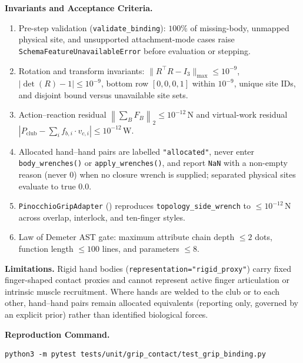 \documentclass[11pt,a4paper]{article}
\begin{document}
\textbf{Invariants and Acceptance Criteria.}
\begin{enumerate}[leftmargin=*,noitemsep]
\item Pre-step validation (\texttt{validate\_binding}): $100\%$ of missing-body, unmapped physical site, and unsupported attachment-mode
cases raise \texttt{SchemaFeatureUnavailableError} before evaluation or stepping.
\item Rotation and transform invariants: $\|R^{\top} R - I_3\|_{\max} \le 10^{-9}$, $|\det(R) - 1| \le 10^{-9}$, bottom row $[0,0,0,1]$ within $10^{-9}$,
unique site IDs, and disjoint bound versus unavailable site sets.
\item Action--reaction residual $\left\|\sum_{B} F_{B}\right\|_2 \le 10^{-12}$\,N and virtual-work residual
$|P_{\mathrm{club}} - \sum_i f_{b,i} \cdot v_{c,i}| \le 10^{-12}$\,W.
\item Allocated hand--hand pairs are labelled \texttt{"allocated"}, never enter \texttt{body\_wrenches()} or \texttt{apply\_wrenches()},
and report \texttt{NaN} with a non-empty reason (never $0$) when no closure wrench is supplied; separated physical sites evaluate to true $0.0$.
\item \texttt{PinocchioGripAdapter} () reproduces
\texttt{topology\_side\_wrench} to $\le 10^{-12}$\,N across overlap, interlock, and ten-finger styles.
\item Law of Demeter AST gate: maximum attribute chain depth $\le 2$ dots, function length $\le 100$ lines, and parameters $\le 8$.
\end{enumerate}

\textbf{Limitations.} Rigid hand bodies (\texttt{representation="rigid\_proxy"}) carry fixed finger-shaped contact proxies and cannot
represent active finger articulation or intrinsic muscle recruitment. Where hands are welded to the club or to each other, hand--hand
pairs remain allocated equivalents (reporting only, governed by an explicit prior) rather than identified biological forces.

\textbf{Reproduction Command.}
\begin{verbatim}
python3 -m pytest tests/unit/grip_contact/test_grip_binding.py
\end{verbatim}
\end{document}
